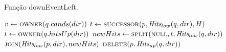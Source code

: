 \begin{algorithm}[H]
    \caption{Função downEventLeft.} \label{alg:par-cinetico:eventodowncaso1}
    \begin{algorithmic}[1]
            \State $v \leftarrow \Call{owner}{q.cands(dir)}$
                \State {}
            \EndIf
            \State {}
            \State $t \leftarrow \Call{successor}{p, \Hits_{low}(q, dir), H}$
                \State $t \leftarrow \Call{owner}{q.hitsUp(dir)}$
            \EndIf
            \State $newHits \leftarrow \Call{split}{\nnull, t, \Hits_{low}(q, dir)}$
            \State $\Call{join}{\Hits_{low}(p, dir), newHits}$
            \State $\Call{delete}{p, \Hits_{up}(q, dir)}$
                \State {}
            \EndIf
        \EndFunction
    \end{algorithmic}
\end{algorithm}